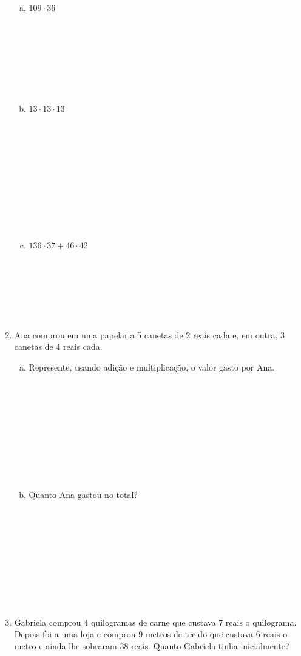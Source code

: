 \documentclass[a4paper,14pt]{article}
\begin{document}
\begin{multicols}{2}
\begin{enumerate}
\begin{enumerate}[a)]
    			\item $109 \cdot 36$ \\\\\\\\\\\\\\\\
    			\item $13 \cdot 13 \cdot 13$ \\\\\\\\\\\\\\\\\\\\\\
    			\item $136 \cdot 37 + 46 \cdot 42$ \\\\\\\\\\\\\\
    		\end{enumerate}
    		\item Ana comprou em uma papelaria 5 canetas de 2 reais cada e, em outra, 3 canetas de 4 reais cada.
    		\begin{enumerate}[a)]
    			\item Represente, usando adição e multiplicação, o valor gasto por Ana. \\\\\\\\\\\\\\\\\\\\
    			\item Quanto Ana gastou no total? \\\\\\\\\\\\\\\\\\\\
    		\end{enumerate}
    		\item Gabriela comprou 4 quilogramas de carne que custava 7 reais o quilograma. Depois foi a uma loja e comprou 9 metros de tecido que custava 6 reais o metro e ainda lhe sobraram 38 reais. Quanto Gabriela tinha inicialmente? 
    	\end{enumerate}
    	$~$ \\ $~$
	\end{multicols}
\end{document}
